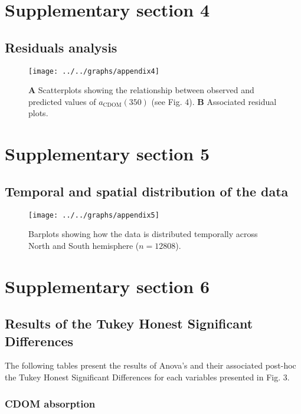 \documentclass[12pt,a4paper]{scrartcl}
\begin{document}
\clearpage
\newpage

\section*{Supplementary section 4}
\subsection*{Residuals analysis}

\begin{figure}[H]
	\centering
	\texttt{[image: ../../graphs/appendix4]}
	\caption{\textbf{A} Scatterplots showing the relationship between observed and predicted values of $a_{\text{CDOM}}(350)$ (see Fig. 4). \textbf{B} Associated residual plots.}
\end{figure}

\clearpage
\newpage

\section*{Supplementary section 5}
\subsection*{Temporal and spatial distribution of the data}

\begin{figure}[h]
	\centering
	\texttt{[image: ../../graphs/appendix5]}
	\caption{Barplots showing how the data is distributed temporally across North and South hemisphere ($n = 12808$).}
\end{figure}

\clearpage
\newpage

\section*{Supplementary section 6}
\subsection*{Results of the Tukey Honest Significant Differences}

The following tables present the results of Anova's and their associated post-hoc the Tukey Honest Significant Differences for each variables presented in Fig. 3.

\subsubsection*{CDOM absorption}
\end{document}
